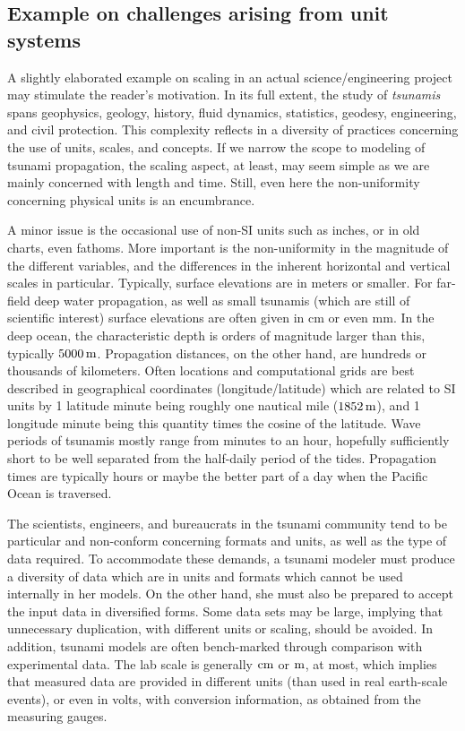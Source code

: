 \documentclass[graybox,envcountchap,sectrefs,final]{svmonodo}
\begin{document}


\subsection{Example on challenges arising from unit systems}

A slightly elaborated example on scaling in an actual
science/engineering project may stimulate the reader's
motivation.  In its full extent, the study of \emph{tsunamis} spans
geophysics, geology, history, fluid dynamics, statistics, geodesy,
engineering, and civil protection. This complexity reflects in a
diversity of practices concerning the use of units, scales, and
concepts. If we narrow the scope to modeling of tsunami
propagation, the scaling aspect, at least, may seem simple as we are
mainly concerned with length and time.  Still, even here the
non-uniformity concerning physical units is an encumbrance.

A minor issue is the occasional use of non-SI units such as inches, or
in old charts, even fathoms.  More important is the non-uniformity in
the magnitude of the different variables, and the differences in the
inherent horizontal and vertical scales in particular.  Typically,
surface elevations are in meters or smaller. For far-field deep water
propagation, as well as small tsunamis (which are still of scientific
interest) surface elevations are often given in cm or even
mm.  In the deep ocean, the characteristic depth is orders of
magnitude larger than this, typically $5000\,\hbox{m}$. Propagation
distances, on the other hand, are hundreds or thousands of
kilometers. Often locations and computational grids are best described
in geographical coordinates (longitude/latitude) which are related to
SI units by 1 latitude minute being roughly one nautical mile
($1852\,\hbox{m}$), and 1 longitude minute being this quantity times
the cosine of the latitude. Wave periods of tsunamis mostly range from
minutes to an hour, hopefully sufficiently short to be well separated
from the half-daily period of the tides. Propagation times are
typically hours or maybe the better part of a day when the Pacific
Ocean is traversed.

The scientists, engineers, and bureaucrats in the tsunami community
tend to be particular and non-conform concerning formats and units, as
well as the type of data required.  To accommodate these demands, a
tsunami modeler must produce a diversity of data which are in units
and formats which cannot be used internally in her models.  On the
other hand, she must also be prepared to accept the input data in
diversified forms.  Some data sets may be large, implying that
unnecessary duplication, with different units or scaling, should be
avoided.  In addition, tsunami models are often bench-marked through
comparison with experimental data. The lab scale is generally
$\hbox{cm}$ or $\hbox{m}$, at most, which implies that measured data
are provided in different units (than used in real earth-scale events),
or even in volts,
with conversion information, as obtained from the measuring gauges.
\end{document}
